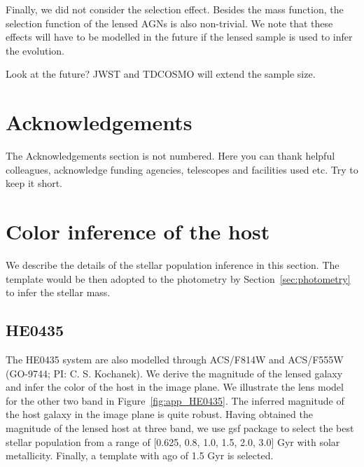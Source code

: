 \documentclass[fleqn,usenatbib]{mnras}
\begin{document}
Finally, we did not consider the selection effect. Besides the mass function, the selection function of the lensed AGNs is also non-trivial. We note that these effects will have to be modelled in the future if the lensed sample is used to infer the evolution. 

Look at the future? JWST and TDCOSMO will extend the sample size.


\section*{Acknowledgements}

The Acknowledgements section is not numbered. Here you can thank helpful
colleagues, acknowledge funding agencies, telescopes and facilities used etc.
Try to keep it short.










\appendix

\section{Color inference of the host}
We describe the details of the stellar population inference in this section. The template would be then adopted to the photometry by Section~\ref{sec:photometry} to infer the stellar mass.
\subsection{HE0435}\label{app:HE0435}
The HE0435 system are also modelled through ACS/F814W and ACS/F555W (GO-9744; PI: C. S. Kochanek). We derive the magnitude of the lensed galaxy and infer the color of the host in the image plane. We illustrate the lens model for the other two band in Figure~\ref{fig:app_HE0435}. The inferred magnitude of the host galaxy in the image plane is quite robust. Having obtained the magnitude of the lensed host at three band, we use {\sc gsf} package to select the best stellar population from a range of [0.625, 0.8, 1.0, 1.5, 2.0, 3.0] Gyr with solar metallicity. Finally, a template with ago of 1.5 Gyr is selected.
\end{document}
